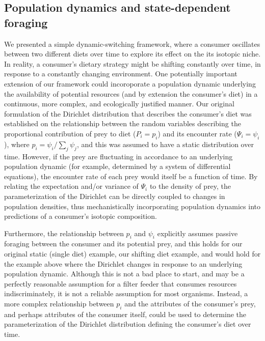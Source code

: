 \documentclass{frontiersSCNS}
\begin{document}
\subsection*{Population dynamics and state-dependent foraging}
We presented a simple dynamic-switching framework, where a consumer oscillates between two different diets over time to explore its effect on the its isotopic niche.
In reality, a consumer's dietary strategy might be shifting constantly over time, in response to a constantly changing environment.
One potentially important extension of our framework could incoroporate a population dynamic underlying the availability of potential resources (and by extension the consumer's diet) in a continuous, more complex, and ecologically justified manner.
Our original formulation of the Dirichlet distribution that describes the consumer's diet was established on the relationship between the random variables describing the proportional contribution of prey to diet ($P_i = p_i$) and its encounter rate ($\Psi_i = \psi_i$), where $p_i = \psi_i/\sum_j \psi_j$, and this was assumed to have a static distribution over time.
However, if the prey are fluctuating in accordance to an underlying population dynamic (for example, determined by a system of differential equations), the encounter rate of each prey would itself be a function of time.
By relating the expectation and/or variance of $\Psi_i$ to the density of prey, the parameterization of the Dirichlet can be directly coupled to changes in population densities, thus mechanistically incorporating population dynamics into predictions of a consumer's isotopic composition.


Furthermore, the relationship between $p_i$ and $\psi_i$ explicitly assumes passive foraging between the consumer and its potential prey, and this holds for our original static (single diet) example, our shifting diet example, and would hold for the example above where the Dirichlet changes in response to an underlying population dynamic.
Although this is not a bad place to start, and may be a perfectly reasonable assumption for a filter feeder that consumes resources indiscriminately, it is not a reliable assumption for most organisms.
Instead, a more complex relationship between $p_i$ and the attributes of the consumer's prey, and perhaps attributes of the consumer itself, could be used to determine the parameterization of the Dirichlet distribution defining the consumer's diet over time.
\end{document}
